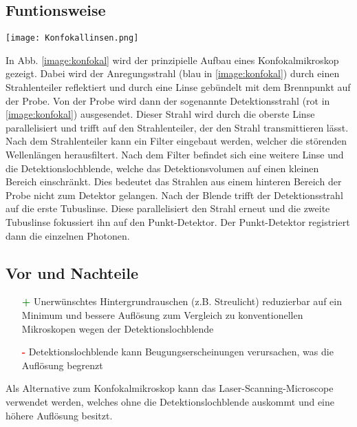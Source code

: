 \subsection*{Funtionsweise}
\begin{center}
    \texttt{[image: Konfokallinsen.png]}
    \label{image:konfokal}
\end{center}
In Abb. \ref{image:konfokal} wird der prinzipielle Aufbau eines Konfokalmikroskop gezeigt. Dabei wird der Anregungsstrahl (blau in \ref{image:konfokal}) durch einen Strahlenteiler reflektiert und durch eine Linse gebündelt mit dem Brennpunkt auf der Probe. Von der Probe wird dann der sogenannte Detektionsstrahl (rot in \ref{image:konfokal}) ausgesendet. Dieser Strahl wird durch die oberste Linse parallelisiert und trifft auf den Strahlenteiler, der den Strahl transmittieren lässt. Nach dem Strahlenteiler kann ein Filter eingebaut werden, welcher die störenden Wellenlängen herausfiltert. Nach dem Filter befindet sich eine weitere Linse und die Detektionslochblende, welche das Detektionsvolumen auf einen kleinen Bereich einschränkt. Dies bedeutet das Strahlen aus einem hinteren Bereich der Probe nicht zum Detektor gelangen. Nach der Blende trifft der Detektionsstrahl auf die erste Tubuslinse. Diese parallelisiert den Strahl erneut und die zweite Tubuslinse fokussiert ihn auf den Punkt-Detektor. Der Punkt-Detektor registriert dann die einzelnen Photonen.
\subsection*{Vor und Nachteile}
\begin{itemize}
    \item[\textcolor{green}{\textbf{+}}] Unerwünschtes Hintergrundrauschen (z.B. Streulicht) reduzierbar auf ein Minimum und bessere Auflösung zum Vergleich zu konventionellen Mikroskopen wegen der Detektionslochblende
    \item[\textcolor{red}{\textbf{-}}] Detektionslochblende kann Beugungserscheinungen verursachen, was die Auflösung begrenzt
\end{itemize}
Als Alternative zum Konfokalmikroskop kann das Laser-Scanning-Microscope verwendet werden, welches ohne die Detektionslochblende auskommt und eine höhere Auflösung besitzt.